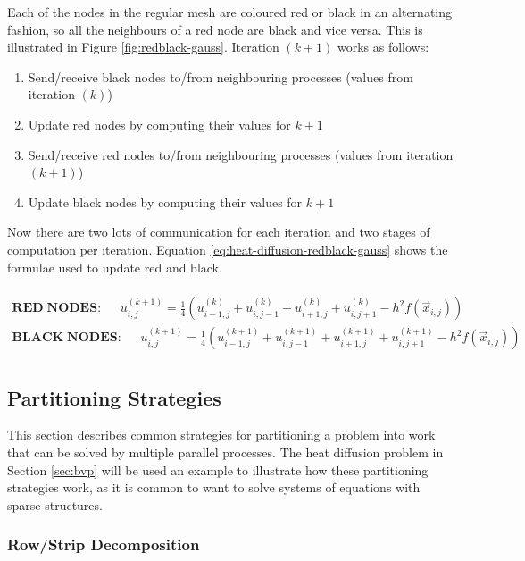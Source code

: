 \documentclass{article}
\begin{document}
Each of the nodes in the regular mesh are coloured red or black in an alternating fashion, so all the neighbours of a red node are black and vice versa. This is illustrated in Figure \ref{fig:redblack-gauss}. Iteration $(k + 1)$ works as follows:
\begin{enumerate}
	\item Send/receive black nodes to/from neighbouring processes (values from iteration $(k)$)
	\item Update red nodes by computing their values for $k + 1$
	\item Send/receive red nodes to/from neighbouring processes (values from iteration $(k + 1)$)
	\item Update black nodes by computing their values for $k + 1$
\end{enumerate}
Now there are two lots of communication for each iteration and two stages of computation per iteration. Equation \ref{eq:heat-diffusion-redblack-gauss} shows the formulae used to update red and black.

\begin{multline}\\
	\mathbf{RED\;NODES}: \;\;\;\;\;
	u_{i,j}^{(k + 1)} = \frac{1}{4}\left( u_{i-1,j}^{(k)} + u_{i,j-1}^{(k)} + u_{i+1,j}^{(k)} + u_{i,j+1}^{(k)} - h^2f(\vec{x}_{i,j}) \right) \\
	\mathbf{BLACK\;NODES}: \;\;\;\;\;
	u_{i,j}^{(k + 1)} = \frac{1}{4}\left( u_{i-1,j}^{(k+1)} + u_{i,j-1}^{(k+1)} + u_{i+1,j}^{(k+1)} + u_{i,j+1}^{(k+1)} - h^2f(\vec{x}_{i,j}) \right) \\
	\label{eq:heat-diffusion-redblack-gauss}
\end{multline}

\subsection{Partitioning Strategies}

This section describes common strategies for partitioning a problem into work that can be solved by multiple parallel processes. The heat diffusion problem in Section \ref{sec:bvp} will be used an example to illustrate how these partitioning strategies work, as it is common to want to solve systems of equations with sparse structures.

\subsubsection{Row/Strip Decomposition}
\end{document}
